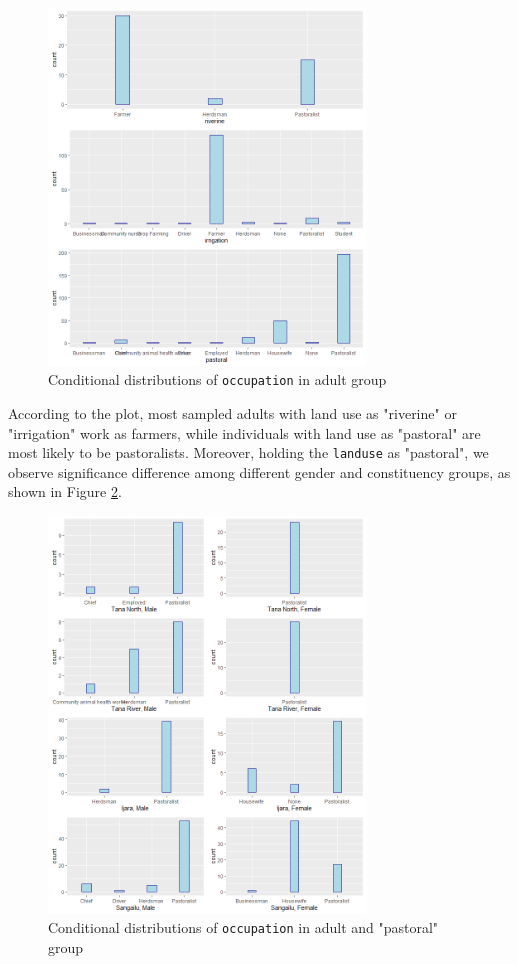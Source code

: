 \documentclass[11pt,twoside]{article}
\numberwithin{Theorem}{section}
\numberwithin{Definition}{section}
\numberwithin{Lemma}{section}
\numberwithin{Algorithm}{section}
\numberwithin{equation}{section}
\begin{document}
\begin{figure}[!h]
	\centering
	\includegraphics[width = 0.75\textwidth]{Images/occupation_landuse.png}
	\caption{Conditional distributions of \texttt{occupation} in adult group}
	\label{fig:occ3}		
\end{figure} 

According to the plot, most sampled adults with land use as "riverine" or "irrigation" work as farmers, while individuals with land use as "pastoral" are most likely to be pastoralists. Moreover, holding the \texttt{landuse} as "pastoral", we observe significance difference among different gender and constituency groups, as shown in Figure \ref{fig:occ4}.

\begin{figure}[!h]
	\centering
	\includegraphics[width = 0.75\textwidth]{Images/occupation_gender_constituency.png}
	\caption{Conditional distributions of \texttt{occupation} in adult and "pastoral" group}
	\label{fig:occ4}		
\end{figure} 
\end{document}
